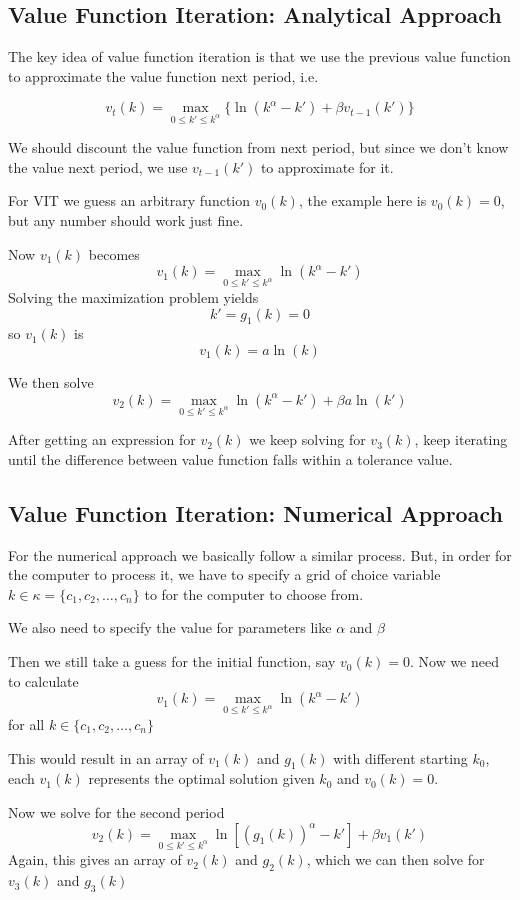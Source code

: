 \documentclass[twocolumn, fleqn]{article}
\begin{document}
	\subsection{Value Function Iteration: Analytical Approach}
	
	The key idea of value function iteration is that we use the previous value function to approximate the value function next period, i.e. 
	
	\[v_t(k) = \max_{0\leq k' \leq k^\alpha} \{\ln(k^\alpha - k')+\beta v_{t-1}(k')\}\]
	
	We should discount the value function from next period, but since we don't know the value next period, we use $v_{t-1}(k')$ to approximate for it.
	
	For VIT we guess an arbitrary function $v_0(k)$, the example here is $v_0(k)=0$, but any number should work just fine.
	
	Now $v_1(k)$ becomes 
	\[v_1(k)= \max_{0\leq k' \leq k^\alpha}{\ln(k^\alpha - k')}\]
	Solving the maximization problem yields
	\[k'=g_1(k)=0\]
	so $v_1(k)$ is 
	\[v_1(k)=a\ln(k)\]
	
	We then solve 
	\[v_2(k)= \max_{0\leq k' \leq k^\alpha}{\ln(k^\alpha - k')}+\beta a\ln(k')\]
	
	After getting an expression for $v_2(k)$ we keep solving for $v_3(k)$, keep iterating until the difference between value function falls within a tolerance value. 
	
	\subsection{Value Function Iteration: Numerical Approach}
	
	For the numerical approach we basically follow a similar process. But, in order for the computer to process it, we have to specify a grid of choice variable $k\in \kappa=\{c_1, c_2, \ldots, c_n\}$ to for the computer to choose from. 
	
	We also need to specify the value for parameters like $\alpha$ and $\beta$
	
	Then we still take a guess for the initial function, say $v_0(k)=0$. Now we need to calculate 
		\[v_1(k)= \max_{0\leq k' \leq k^\alpha}{\ln(k^\alpha - k')}\]
		for all $k\in \{c_1, c_2, \ldots, c_n\}$
		
	This would result in an array of $v_1(k)$ and $g_1(k)$ with different starting $k_0$, each $v_1(k)$ represents the optimal solution given $k_0$ and $v_0(k)=0$.
	
	Now we solve for the second period
	\[v_2(k)= \max_{0\leq k' \leq k^\alpha}{\ln[(g_1(k))^\alpha - k']}+\beta v_1(k')\]
	Again, this gives an array of $v_2(k)$ and $g_2(k)$, which we can then solve for $v_3(k)$ and $g_3(k)$ 
	
\end{document}
